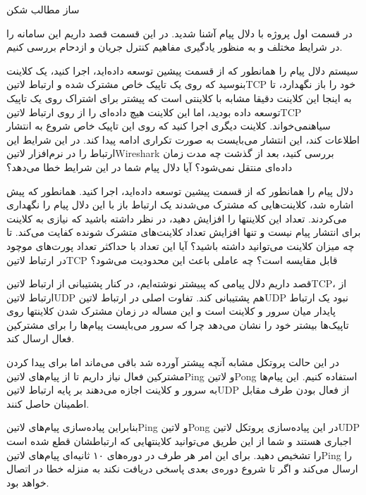 \documentclass[]{article}
\begin{document}
  ‌ساز
  ‌مطالب
  ‌شکن

  در قسمت اول پروژه با دلال پیام آشنا شدید. در این قسمت قصد داریم این سامانه را در شرایط مختلف
  و به منظور یادگیری مفاهیم کنترل جریان و ازدحام بررسی کنیم.


  سیستم دلال پیام را همانطور که از قسمت پیشین توسعه داده‌اید، اجرا کنید، یک کلاینت بنوسید که روی یک تاپیک خاص مشترک شده
  و ارتباط ‌لاتین{TCP} خود را باز نگهدارد، تا به اینجا این کلاینت دقیقا مشابه با کلاینتی است که پیشتر برای اشتراک روی یک تاپیک توسعه داده بودید،
  اما این کلاینت هیچ داده‌ای را از روی ارتباط ‌لاتین{TCP} ‌سیاه{نمی‌خواند}.
  کلاینت دیگری اجرا کنید که روی این تاپیک خاص شروع به انتشار اطلاعات کند، این انتشار می‌بایست به صورت تکراری ادامه پیدا کند.
  در این شرایط این ارتباط را در نرم‌افزار ‌لاتین{Wireshark} بررسی کنید، بعد از گذشت چه مدت زمان داده‌ای منتقل نمی‌شود؟
  آیا دلال پیام شما در این شرایط خطا می‌دهد؟


  دلال پیام را همانطور که از قسمت پیشین توسعه داده‌اید، اجرا کنید. همانطور که پیش اشاره شد، کلاینت‌هایی که مشترک می‌شدند
  یک ارتباط باز با این دلال پیام را نگهداری می‌کردند. تعداد این کلاینتها را افزایش دهید، در نظر داشته باشید که نیازی به کلاینت برای انتشار
  پیام نیست و تنها افزایش تعداد کلاینت‌های متشرک شونده کفایت می‌کند.
  تا چه میزان کلاینت می‌توانید داشته باشید؟ آیا این تعداد با حداکثر تعداد
  پورت‌های موچود در ارتباط ‌لاتین{TCP} قابل مقایسه است؟ چه عاملی باعث این محدودیت می‌شود؟


  قصد داریم دلال پیامی که پبیشتر نوشته‌ایم، در کنار پشتیبانی از ارتباط ‌لاتین{TCP}، از ارتباط ‌لاتین{UDP} هم پشتیبانی کند.
  تفاوت اصلی در ارتباط ‌لاتین{UDP} نبود یک ارتباط پایدار میان سرور و کلاینت است و این مساله در زمان مشترک شدن
  کلاینتها روی تاپیک‌ها بیشتر خود را نشان می‌دهد چرا که سرور می‌بایست پیام‌ها را برای مشترکین فعال ارسال کند.

  در این حالت پروتکل مشابه آنچه پیشتر آورده شد باقی می‌ماند اما برای پیدا کردن مشترکین فعال نیاز داریم تا از پیام‌های
  ‌لاتین{Ping} و ‌لاتین{Pong} استفاده کنیم. این پیام‌ها به سرور و کلاینت اجازه می‌دهند بر پایه ارتباط ‌لاتین{UDP}
  از فعال بودن طرف مقابل اطمینان حاصل کنند.

  بنابراین پیاده‌سازی پیام‌های ‌لاتین{Ping} و ‌لاتین{Pong} در این پیاده‌سازی پروتکل ‌لاتین{UDP} اجباری هستند
  و شما از این طریق می‌توانید کلاینتهایی که ارتباطشان قطع شده است را تشخیص دهید. برای این امر هر طرف در دوره‌های ۱۰
  ثانیه‌ای پیام‌های ‌لاتین{Ping} را ارسال می‌کند و اگر تا شروع دوره‌ی بعدی پاسخی دریافت نکند به منزله خطا در اتصال خواهد بود.
\end{document}
